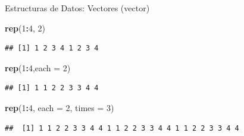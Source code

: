 \documentclass[ignorenonframetext,]{beamer}
\newenvironment{Shaded}{\begin{snugshade}}{\end{snugshade}}
\newcommand{\KeywordTok}[1]{\textcolor[rgb]{0.13,0.29,0.53}{\textbf{#1}}}
\newcommand{\DataTypeTok}[1]{\textcolor[rgb]{0.13,0.29,0.53}{#1}}
\newcommand{\DecValTok}[1]{\textcolor[rgb]{0.00,0.00,0.81}{#1}}
\newcommand{\OperatorTok}[1]{\textcolor[rgb]{0.81,0.36,0.00}{\textbf{#1}}}
\newcommand{\NormalTok}[1]{#1}
\begin{document}
\begin{frame}[fragile]{Estructuras de Datos: Vectores (vector)}

\begin{Shaded}
\begin{Highlighting}[]
\KeywordTok{rep}\NormalTok{(}\DecValTok{1}\OperatorTok{:}\DecValTok{4}\NormalTok{, }\DecValTok{2}\NormalTok{)}
\end{Highlighting}
\end{Shaded}

\begin{verbatim}
## [1] 1 2 3 4 1 2 3 4
\end{verbatim}

\begin{Shaded}
\begin{Highlighting}[]
\KeywordTok{rep}\NormalTok{(}\DecValTok{1}\OperatorTok{:}\DecValTok{4}\NormalTok{,}\DataTypeTok{each =} \DecValTok{2}\NormalTok{)}
\end{Highlighting}
\end{Shaded}

\begin{verbatim}
## [1] 1 1 2 2 3 3 4 4
\end{verbatim}

\begin{Shaded}
\begin{Highlighting}[]
\KeywordTok{rep}\NormalTok{(}\DecValTok{1}\OperatorTok{:}\DecValTok{4}\NormalTok{, }\DataTypeTok{each =} \DecValTok{2}\NormalTok{, }\DataTypeTok{times =} \DecValTok{3}\NormalTok{)}
\end{Highlighting}
\end{Shaded}

\begin{verbatim}
##  [1] 1 1 2 2 3 3 4 4 1 1 2 2 3 3 4 4 1 1 2 2 3 3 4 4
\end{verbatim}

\end{frame}
\end{document}
